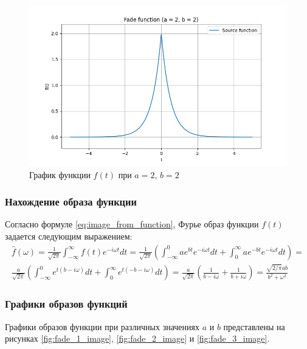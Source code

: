 \begin{figure}[ht!]
    \centering
    \includegraphics[width=\textwidth]{media/fade_3.png}
    \caption{График функции $f(t)$ при $a = 2$, $b = 2$}
    \label{fig:fade_3}
\end{figure}

\subsubsection{Нахождение образа функции}
Согласно формуле \eqref{eq:image_from_function}, Фурье образ функции $f(t)$ задается следующим выражением:
\begin{multline}
    \hat{f}(\omega) = \frac{1}{\sqrt{2\pi}} \int_{-\infty}^{\infty} f(t) e^{-i\omega t} dt = \frac{1}{\sqrt{2\pi}} \left(\int_{-\infty}^{0} ae^{bt} e^{-i\omega t} dt + \int_{0}^{\infty} ae^{-bt} e^{-i\omega t} dt\right) = \\
    \frac{a}{\sqrt{2\pi}} \left(\int_{-\infty}^0 e^{t(b -i \omega)}dt + \int_0^{\infty} e^{t(-b - i\omega)}dt\right) = \frac{a}{\sqrt{2 \pi}} \left( \frac{1}{b - i\omega} + \frac{1}{b + i\omega}\right) = \frac{\sqrt{2/\pi}ab}{b^2 + \omega^2}
    \label{eq:fade_function_image}
\end{multline}

\subsubsection{Графики образов функций}
Графики образов функции при различных значениях $a$ и $b$ представлены на рисунках \ref{fig:fade_1_image}, \ref{fig:fade_2_image} и \ref{fig:fade_3_image}.


